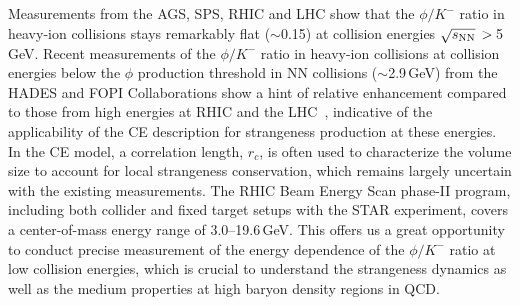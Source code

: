 \documentclass[%
 reprint,	
showpacs,
 amsmath,amssymb,
 aps,
 prc,
]{revtex4-1}
\begin{document}
Measurements from the AGS, SPS, RHIC and LHC show that the $\phi/K^-$ ratio in heavy-ion collisions stays remarkably flat ($\sim$0.15) at collision energies $\sqrt{s_{\rm NN}}\,>\,$5\,GeV. Recent measurements of the $\phi/K^-$ ratio in heavy-ion collisions at collision energies below the $\phi$ production threshold in NN collisions ($\sim$2.9\,GeV) from the HADES and FOPI Collaborations show a hint of relative enhancement compared to those from high energies at RHIC and the LHC~\cite{E917_phi,NA49_phi,FOPI_phi_AlAl,FOPI_phi_NiNi,HADES_phi_ArKCl,HADES_phi_AuAu}, %
indicative of the applicability of the CE description for strangeness production at these energies. In the CE model, a correlation length, $r_c$, is often used to characterize the volume size to account for local strangeness conservation, which remains largely uncertain with the existing measurements.
The RHIC Beam Energy Scan phase-II program, including both collider and fixed target setups with the STAR experiment, covers a center-of-mass energy range of 3.0--19.6\,GeV. This offers us a great opportunity to conduct precise measurement of the energy dependence of the $\phi/K^-$ ratio at low collision energies, which is crucial to understand the strangeness dynamics as well as the medium properties at high baryon density regions in QCD.
\end{document}

